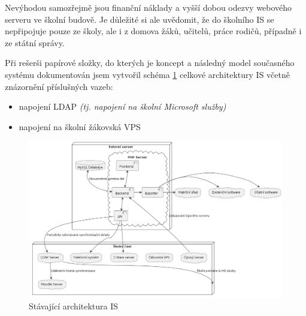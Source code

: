 \documentclass[FM,Proj]{tulthesis}
\begin{document}
Nevýhodou samozřejmě jsou finanční náklady a vyšší dobou odezvy webového serveru 
ve školní budově. Je důležité si ale uvědomit, že do školního IS se nepřipojuje 
pouze ze školy, ale i z domova žáků, učitelů, práce rodičů, případně i ze státní správy.  

Při rešerši papírové složky, do kterých je koncept a následný model současného systému dokumentován
jsem vytvořil schéma \ref{fig:architecture-old} celkové architektury IS včetně znázornění 
příslušných vazeb:
\begin{itemize}
    \item napojení LDAP \textit{(tj. napojení na školní Microsoft služby)}
    \item napojení na školní žákovská VPS
\end{itemize}

\begin{figure}[H]
    \includegraphics[width=\textwidth-28pt]{architektura-puvodni.png}
    \caption{Stávající architektura IS}
    \label{fig:architecture-old}
\end{figure}
\end{document}
